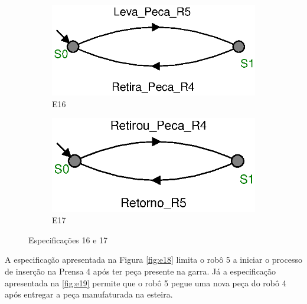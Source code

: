 \begin{figure}[H]%
  \centering
  \begin{subfigure}{0.45\textwidth}
      \centering
      \includegraphics[width=\textwidth]{imagens/E16.eps}
      \caption{E16}
      \label{fig:e16}
  \end{subfigure}
  \hfill
  \begin{subfigure}{0.45\textwidth}
      \centering
      \includegraphics[width=\textwidth]{imagens/E17.eps}
      \caption{E17}
      \label{fig:e17}
  \end{subfigure}
  \caption{Especificações 16 e 17}
  \label{fig:e1617}
\end{figure}

A especificação apresentada na Figura \ref{fig:e18} limita o robô 5 a iniciar o processo de inserção na Prensa 4 após ter peça presente na garra.
Já a especificação apresentada na \ref{fig:e19} permite que o robô 5 pegue uma nova peça do robô 4 após entregar a peça manufaturada na esteira.

